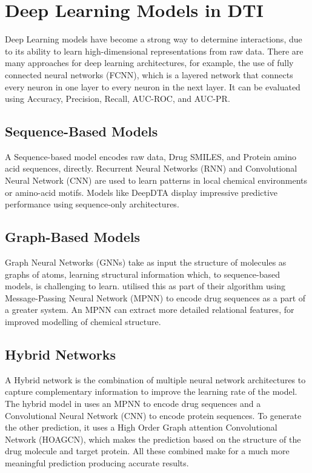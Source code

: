 \section{Deep Learning Models in DTI}
Deep Learning models have become a strong way to determine interactions, due to its ability to learn high-dimensional representations from raw data.
There are many approaches for deep learning architectures, for example, the use of fully connected neural networks (FCNN), \citep{Talukder2025,Zhan2025} which is a layered network that connects every neuron in one layer to every neuron in the next layer.
It can be evaluated using Accuracy, Precision, Recall, AUC-ROC, and AUC-PR.

\subsection{Sequence-Based Models}
A Sequence-based model encodes raw data, Drug SMILES, and Protein amino acid sequences, directly.
Recurrent Neural Networks (RNN) and Convolutional Neural Network (CNN) are used to learn patterns in local chemical environments or amino-acid motifs.
Models like DeepDTA \citep{Ozturk2018} display impressive predictive performance using sequence-only architectures.

\subsection{Graph-Based Models}
Graph Neural Networks (GNNs) take as input the structure of molecules as graphs of atoms, learning structural information which, to sequence-based models, is challenging to learn.
\citet{Yang2024} utilised this as part of their algorithm using Message-Passing Neural Network (MPNN) to encode drug sequences as a part of a greater system.
An MPNN can extract more detailed relational features, for improved modelling of chemical structure.

\subsection{Hybrid Networks} 
A Hybrid network is the combination of multiple neural network architectures to capture complementary information to improve the learning rate of the model.
The hybrid model in \citep{Yang2024} uses an MPNN to encode drug sequences and a Convolutional Neural Network (CNN) to encode protein sequences.
To generate the other prediction, it uses a High Order Graph attention Convolutional Network (HOAGCN), which makes the prediction based on the structure of the drug molecule and target protein.
All these combined make for a much more meaningful prediction producing accurate results.


